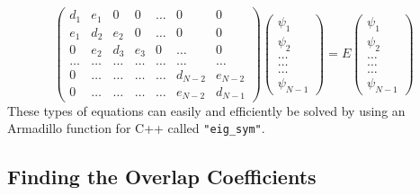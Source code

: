 \documentclass[../main.tex]{subfiles}
\begin{document}
\begin{equation}
    \left( \begin{array}{ccccccc} d_1 & e_1 & 0   & 0    & \dots  &0     & 0 \\
                                e_1 & d_2 & e_2 & 0    & \dots  &0     &0 \\
                                0   & e_2 & d_3 & e_3  &0       &\dots & 0\\
                                \dots  & \dots & \dots & \dots  &\dots      &\dots & \dots\\
                                0   & \dots & \dots & \dots  &\dots       &d_{N-2} & e_{N-2}\\
                                0   & \dots & \dots & \dots  &\dots       &e_{N-2} & d_{N-1}

             \end{array} \right)      \left( \begin{array}{c} \psi_{1} \\
                                                              \psi_{2} \\
                                                              \dots\\ \dots\\ \dots\\
                                                              \psi_{N-1}
             \end{array} \right)=E \left( \begin{array}{c} \psi_{1} \\
                                                              \psi_{2} \\
                                                              \dots\\ \dots\\ \dots\\
                                                              \psi_{N-1}
             \end{array} \right) 
      \label{eq:sematrix}
\end{equation}
These types of equations can easily and efficiently be solved by using an Armadillo function for C++ called \texttt{"eig\_sym"}.




\subsection{Finding the Overlap Coefficients}\label{sec:FindingCoefficients}
\end{document}

